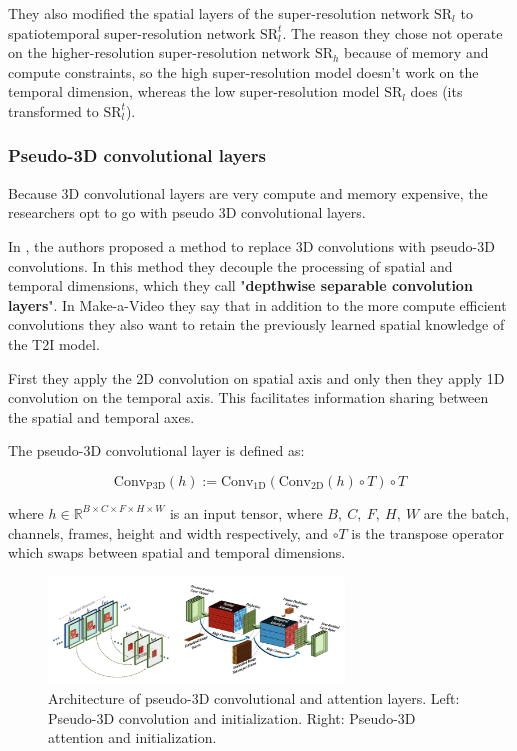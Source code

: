 They also modified the spatial layers of the super-resolution network $\text{SR}_l$ to spatiotemporal super-resolution network $\text{SR}_l^t$. The reason they chose not operate on the higher-resolution super-resolution network $\text{SR}_h$ because of memory and compute constraints, so the high super-resolution model doesn't work on the temporal dimension, whereas the low super-resolution model $\text{SR}_l$ does (its transformed to $\text{SR}_l^t$).



\subsubsection{Pseudo-3D convolutional layers}

Because 3D convolutional layers are very compute and memory expensive, the researchers opt to go with pseudo 3D convolutional layers.

In \cite{chollet2017xception}, the authors proposed a method to replace 3D convolutions with pseudo-3D convolutions. In this method they decouple the processing of spatial and temporal dimensions, which they call "\textbf{depthwise separable convolution layers}". In Make-a-Video they say that in addition to the more compute efficient convolutions they also want to retain the previously learned spatial knowledge of the T2I model.

First they apply the 2D convolution on spatial axis and only then they apply 1D convolution on the temporal axis. This facilitates information sharing between the spatial and temporal axes.

The pseudo-3D convolutional layer is defined as:

\[ 
\text{Conv}_{\text{P3D}} (h) := \text{Conv}_{\text{1D}} (
    \text{Conv}_{\text{2D}} (h) \circ T
) \circ T \]

where $h \in \mathbb{R}^{B\times C\times F\times H\times W}$ is an input tensor, where $B,\ C,\ F,\ H,\ W$ are the batch, channels, frames, height and width respectively, and $\circ T$ is the transpose operator which swaps between spatial and temporal dimensions.

\begin{figure}
    \centering
    \includegraphics[width=0.7\textwidth]{images/make_a_video/pseudo_3d.png}
    \caption{Architecture of pseudo-3D convolutional and attention layers. Left: Pseudo-3D convolution and initialization. Right: Pseudo-3D attention and initialization.}
    \label{fig:make_a_video_pseudo_3d_conv_and_attention}
\end{figure}

